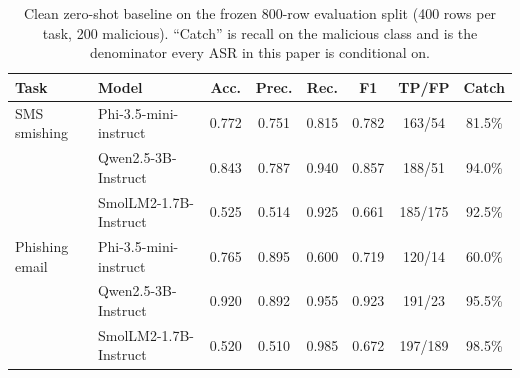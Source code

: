 \begin{table}[t]
\centering
\small
\caption{Clean zero-shot baseline on the frozen 800-row evaluation split (400 rows per task, 200 malicious). ``Catch'' is recall on the malicious class and is the denominator every ASR in this paper is conditional on.}
\label{tab:baseline}
\begin{tabular}{llcccccc}
\toprule
\textbf{Task} & \textbf{Model} & \textbf{Acc.} & \textbf{Prec.} & \textbf{Rec.} & \textbf{F1} & \textbf{TP/FP} & \textbf{Catch} \\
\midrule
 SMS smishing & Phi-3.5-mini-instruct & 0.772 & 0.751 & 0.815 & 0.782 & 163/54 & 81.5\% \\
  & Qwen2.5-3B-Instruct & 0.843 & 0.787 & 0.940 & 0.857 & 188/51 & 94.0\% \\
  & SmolLM2-1.7B-Instruct & 0.525 & 0.514 & 0.925 & 0.661 & 185/175 & 92.5\% \\
\midrule
 Phishing email & Phi-3.5-mini-instruct & 0.765 & 0.895 & 0.600 & 0.719 & 120/14 & 60.0\% \\
  & Qwen2.5-3B-Instruct & 0.920 & 0.892 & 0.955 & 0.923 & 191/23 & 95.5\% \\
  & SmolLM2-1.7B-Instruct & 0.520 & 0.510 & 0.985 & 0.672 & 197/189 & 98.5\% \\
\bottomrule
\end{tabular}
\end{table}
